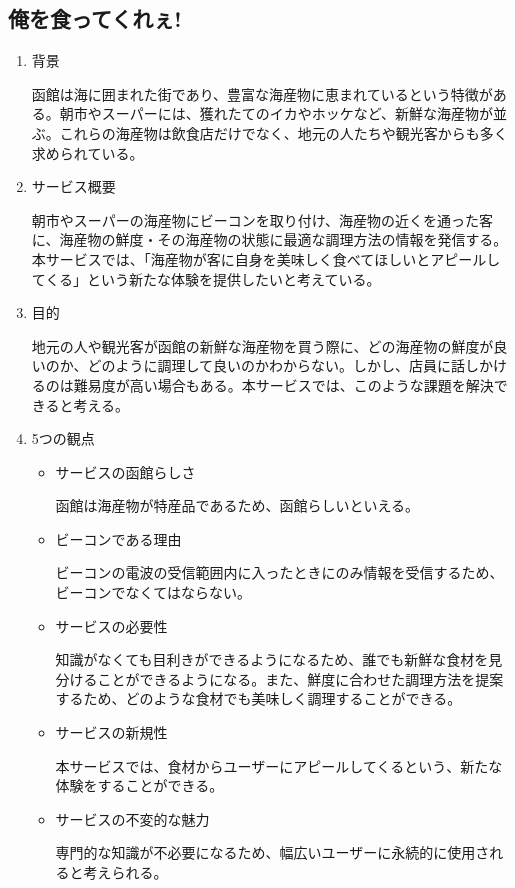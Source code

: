 \subsection{俺を食ってくれぇ!}
\begin{enumerate}
    \item 背景
    \par 函館は海に囲まれた街であり、豊富な海産物に恵まれているという特徴がある。朝市やスーパーには、獲れたてのイカやホッケなど、新鮮な海産物が並ぶ。これらの海産物は飲食店だけでなく、地元の人たちや観光客からも多く求められている。
    \item サービス概要
    \par 朝市やスーパーの海産物にビーコンを取り付け、海産物の近くを通った客に、海産物の鮮度・その海産物の状態に最適な調理方法の情報を発信する。本サービスでは、「海産物が客に自身を美味しく食べてほしいとアピールしてくる」という新たな体験を提供したいと考えている。
    \item 目的
    \par 地元の人や観光客が函館の新鮮な海産物を買う際に、どの海産物の鮮度が良いのか、どのように調理して良いのかわからない。しかし、店員に話しかけるのは難易度が高い場合もある。本サービスでは、このような課題を解決できると考える。
    \item 5つの観点
    \begin{itemize}
       \item サービスの函館らしさ
        \par 函館は海産物が特産品であるため、函館らしいといえる。
        \item ビーコンである理由
        \par ビーコンの電波の受信範囲内に入ったときにのみ情報を受信するため、ビーコンでなくてはならない。
        \item サービスの必要性
        \par 知識がなくても目利きができるようになるため、誰でも新鮮な食材を見分けることができるようになる。また、鮮度に合わせた調理方法を提案するため、どのような食材でも美味しく調理することができる。
        \item サービスの新規性
        \par 本サービスでは、食材からユーザーにアピールしてくるという、新たな体験をすることができる。
        \item サービスの不変的な魅力
        \par 専門的な知識が不必要になるため、幅広いユーザーに永続的に使用されると考えられる。
    \end{itemize}
\end{enumerate}

